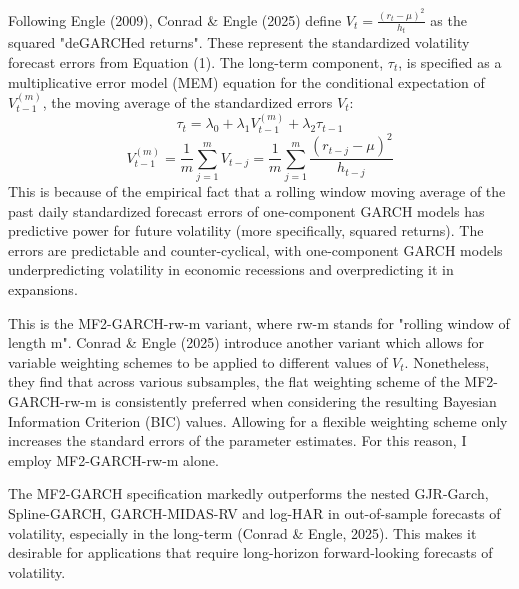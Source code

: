 \documentclass[12pt]{article}
\begin{document}
Following Engle (2009), Conrad \& Engle (2025) define $V_t=\frac{(r_t-\mu)^2}{h_t}$ as the squared "deGARCHed returns". These represent the standardized volatility forecast errors from Equation (1). The long-term component, $\tau_t$, is specified as a multiplicative error model (MEM) equation for the conditional expectation of $V_{t-1}^{(m)}$, the moving average of the standardized errors $V_t$:
\begin{equation}
\tau_t=\lambda_0+\lambda_1V_{t-1}^{(m)}+\lambda_2\tau_{t-1}
\end{equation}
\begin{equation}
V_{t-1}^{(m)}=\frac{1}{m}\sum_{j=1}^mV_{t-j}=\frac{1}{m}\sum_{j=1}^m\frac{(r_{t-j}-\mu)^2}{h_{t-j}}
\end{equation}
This is because of the empirical fact that a rolling window moving average of the past daily standardized forecast errors of one-component GARCH models has predictive power for future volatility (more specifically, squared returns). The errors are predictable and counter-cyclical, with one-component GARCH models underpredicting volatility in economic recessions and overpredicting it in expansions. \par
This is the MF2-GARCH-rw-m variant, where rw-m stands for "rolling window of length m". Conrad \& Engle (2025) introduce another variant which allows for variable weighting schemes to be applied to different values of $V_t$. Nonetheless, they find that across various subsamples, the flat weighting scheme of the MF2-GARCH-rw-m is consistently preferred when considering the resulting Bayesian Information Criterion (BIC) values. Allowing for a flexible weighting scheme only increases the standard errors of the parameter estimates. For this reason, I employ MF2-GARCH-rw-m alone.\par
The MF2-GARCH specification markedly outperforms the nested GJR-Garch, Spline-GARCH, GARCH-MIDAS-RV and log-HAR in out-of-sample forecasts of volatility, especially in the long-term (Conrad \& Engle, 2025). This makes it desirable for applications that require long-horizon forward-looking forecasts of volatility.\par
\end{document}
